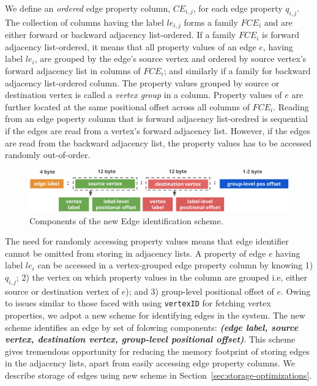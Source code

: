 We define an \emph{ordered} edge property column, $CE_{i,j}$, for each edge property $q_{i,j}$. The collection of columns having the label $le_{i,j}$ forms a family $FCE_i$ and are either forward or backward adjacency list-ordered. If a family $FCE_i$ is forward adjacency list-ordered, it means that all property values of an edge $e$, having label $le_i$, are grouped by the edge's source vertex and ordered by source vertex's forward adjacency list in columns of $FCE_i$; and similarly if a family for backward adjacency list-ordered column. The property values grouped by source or destination vertex is called a \emph{vertex group} in a column. Property values of $e$ are further located at the same positional offset across all columns of $FCE_i$. Reading from an edge poperty column that is forward adjacency list-oredred is sequential if the edges are read from a vertex's forward adjacency list. However, if the edges are read from the backward adjacency list, the property values has to be accessed randomly out-of-order.

\begin{figure}
	\vspace{-5pt}
	\hfill\includegraphics[scale=0.78]{img/edge-scheme}\hspace*{\fill}
	\caption{Components of the new Edge identification scheme.}
	\label{fig:edge-scheme}
	\vspace{5pt}
\end{figure}

The need for randomly accessing property values means that edge identifier cannot be omitted from storing in adjacency lists. A property of edge $e$ having label $le_i$ can be accessed in a vertex-grouped edge property column by knowing 1) $q_{i,j}$; 2) the vertex on which property values in the column are grouped i.e, either source or destination vertex of $e$); and 3) group-level positional offset of $e$. Owing to issues similar to those faced with using \texttt{vertexID} for fetching vertex properties, we adpot a new scheme for identifying edges in the system. The new scheme identifies an edge by set of folowing components: \textbf{\emph{(edge label, source vertex, destination vertex, group-level positional offset)}}. This scheme gives tremendous opportunity for reducing the memory footprint of storing edges in the adjacency lists, apart from easily accessing edge property columns. We describe storage of edges using new scheme in Section~\ref{sec:storage-optimizations}.


